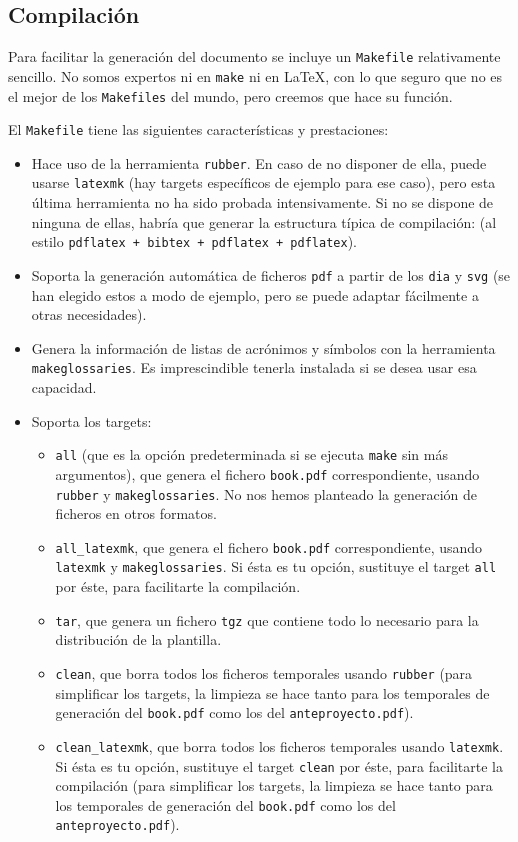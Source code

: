 \subsection{Compilación}
\label{sec:compilacion}

Para facilitar la generación del documento se incluye un
\texttt{Makefile} relativamente sencillo. No somos expertos ni en
\texttt{make} ni en \LaTeX, con lo que seguro que no es el mejor de los
\texttt{Makefiles} del mundo, pero creemos que hace su función.

El \texttt{Makefile} tiene las siguientes características y
prestaciones:

\begin{itemize}

\item Hace uso de la herramienta \texttt{rubber}. En caso de no disponer
  de ella, puede usarse \texttt{latexmk} (hay targets específicos de
  ejemplo para ese caso), pero esta última herramienta no ha sido
  probada intensivamente. Si no se dispone de ninguna de ellas, habría
  que generar la estructura típica de compilación: (al estilo
  \texttt{pdflatex + bibtex + pdflatex + pdflatex}).
\item Soporta la generación automática de ficheros \texttt{pdf} a partir
  de los \texttt{dia} y \texttt{svg} (se han elegido estos a modo de
  ejemplo, pero se puede adaptar fácilmente a otras necesidades).
\item Genera la información de listas de acrónimos y símbolos con la
  herramienta \texttt{makeglossaries}. Es imprescindible tenerla
  instalada si se desea usar esa capacidad.
\item Soporta los targets:
  \begin{itemize}
  \item \texttt{all} (que es la opción predeterminada si se ejecuta
    \texttt{make} sin más argumentos), que genera el fichero
    \texttt{book.pdf} correspondiente, usando \texttt{rubber} y
    \texttt{makeglossaries}. No nos hemos planteado la generación de
    ficheros en otros formatos.
  \item \texttt{all\_latexmk}, que genera el fichero \texttt{book.pdf}
    correspondiente, usando \texttt{latexmk} y
    \texttt{makeglossaries}. Si ésta  es tu opción, sustituye el target
    \texttt{all} por éste, para facilitarte la compilación.

  \item  \texttt{tar}, que genera un fichero \texttt{tgz} que contiene
    todo lo necesario para la distribución de la plantilla.
  \item \texttt{clean}, que borra todos los ficheros temporales usando
    \texttt{rubber} (para simplificar los targets, la limpieza se hace
    tanto para los temporales de generación del \texttt{book.pdf} como
    los del \texttt{anteproyecto.pdf}).
  \item \texttt{clean\_latexmk}, que borra todos los ficheros temporales
    usando \texttt{latexmk}. Si ésta es tu opción, sustituye el target
    \texttt{clean} por éste, para facilitarte la compilación (para
    simplificar los targets, la limpieza se hace tanto para los
    temporales de generación del \texttt{book.pdf} como los del
    \texttt{anteproyecto.pdf}).


\end{itemize}
\end{itemize}
